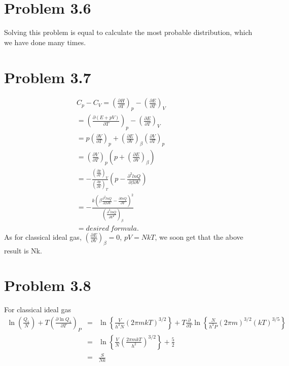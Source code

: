 \documentclass{article}
\begin{document}
\section*{Problem 3.6}

    Solving this problem is equal to calculate the most probable distribution, which we have done many times.

\section*{Problem 3.7}
\begin{eqnarray*}
C_p-C_V=(\frac{\partial H}{\partial T})_p-(\frac{\partial E}{\partial T})_V   \qquad\quad\\
=(\frac{\partial (E+pV)}{\partial T})_p-(\frac{\partial E}{\partial T})_V   \\
=p (\frac{\partial V}{\partial T})_p+(\frac{\partial E}{\partial V})_{\beta}(\frac{\partial V}{\partial T})_p  \\
=(\frac{\partial V}{\partial T})_p (p+(\frac{\partial E}{\partial V})_{\beta} ) \qquad \\
=-\frac{(\frac{\partial p}{\partial T})_V}{(\frac{\partial p}{\partial V})_T}(p-\frac{\partial^2 lnQ}{\partial \beta \partial V})  \quad \\
=-\frac{k(\beta \frac{\partial^2 ln Q}{\partial \beta \partial V}-\frac{\partial lnQ}{\partial V})^2}{(\frac{\partial^2 lnQ}{\partial V^2})_{\beta}} \quad\\
=desired \ formula.\qquad
\end{eqnarray*}
As for classical ideal gas, $(\frac{\partial E}{\partial V})_{\beta}=0$, $pV=NkT$, we soon get that the above result is Nk.


\section*{Problem 3.8}
For classical ideal gas
\begin{eqnarray*}
\ln\left(\frac{Q_1}{N}\right)+T\left(\frac{\partial \ln Q_1}{\partial T}\right)_P&=&\ln\left\{\frac{V}{h^3N}(2\pi mkT)^{3/2}\right\}+T\frac{\partial}{\partial T}\ln\left\{\frac{N}{h^3P}(2\pi m)^{3/2}(kT)^{3/5}\right\}\\
&=&\ln\left\{\frac{V}{N}(\frac{2\pi mkT}{h^2})^{3/2}\right\}+\frac{5}{2}\\
&=&\frac{S}{Nk}
\end{eqnarray*}
\end{document}
